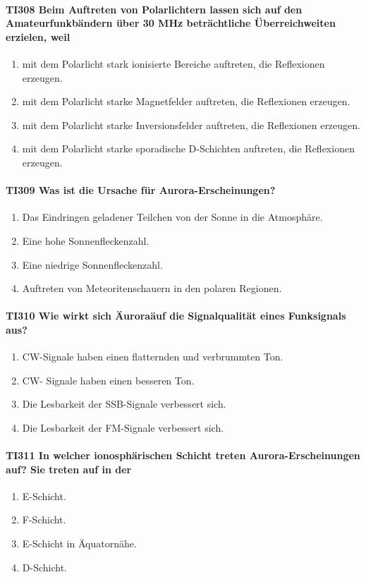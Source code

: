 \documentclass[8pt]{article}
\begin{document}
\paragraph*{TI308 Beim Auftreten von Polarlichtern lassen sich auf den Amateurfunkbändern über 30 MHz beträchtliche Überreichweiten erzielen, weil}
\begin{enumerate}[nolistsep,label=\Alph*]
\item mit dem Polarlicht stark ionisierte Bereiche auftreten, die Reflexionen erzeugen. 
\item mit dem Polarlicht starke Magnetfelder auftreten, die Reflexionen erzeugen.
\item mit dem Polarlicht starke Inversionsfelder auftreten, die Reflexionen erzeugen.
\item mit dem Polarlicht starke sporadische D-Schichten auftreten, die Reflexionen erzeugen.
\end{enumerate}

\paragraph*{TI309 Was ist die Ursache für Aurora-Erscheinungen?}
\begin{enumerate}[nolistsep,label=\Alph*]
\item Das Eindringen geladener Teilchen von der Sonne in die Atmosphäre.
\item Eine hohe Sonnenfleckenzahl.
\item Eine niedrige Sonnenfleckenzahl.
\item Auftreten von Meteoritenschauern in den polaren Regionen.
\end{enumerate}

\paragraph*{TI310 Wie wirkt sich \"Aurora\" auf die Signalqualität eines Funksignals aus?}
\begin{enumerate}[nolistsep,label=\Alph*]
\item CW-Signale haben einen flatternden und verbrummten Ton.
\item CW- Signale haben einen besseren Ton.
\item Die Lesbarkeit der SSB-Signale verbessert sich.
\item Die Lesbarkeit der FM-Signale verbessert sich.
\end{enumerate}

\paragraph*{TI311 In welcher ionosphärischen Schicht treten Aurora-Erscheinungen auf? Sie treten auf in der}
\begin{enumerate}[nolistsep,label=\Alph*]
\item E-Schicht.
\item F-Schicht.
\item E-Schicht in Äquatornähe.
\item D-Schicht.
\end{enumerate}
\end{document}
